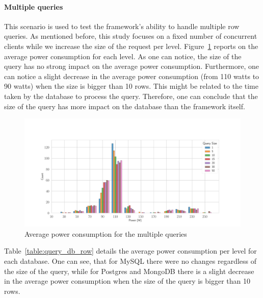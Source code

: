 \paragraph{Multiple queries}
This scenario is used to test the framework's ability to handle multiple row queries.
As mentioned before, this study focuses on a fixed number of concurrent clients while we increase the size of the request per level.
Figure~\ref{fig:av_power_query} reports on the average power consumption for each level.
As one can notice, the size of the query has no strong impact on the average power consumption.
Furthermore, one can notice a slight decrease in the average power consumption (from 110 watts to 90 watts) when the size is bigger than 10 rows.
This might be related to the time taken by the database to process the query.
Therefore, one can conclude that the size of the query has more impact on the database than the framework itself.

\begin{figure}[hbt]
    \centering
    \includegraphics[width=
        \columnwidth]{imgs/histogram_av_power_cpu_query}
    \caption{Average power consumption for the multiple queries}
    \label{fig:av_power_query}
\end{figure}

Table~\ref{table:query_db_row} details the average power consumption per level for each database.
One can see, that for MySQL there were no changes regardless of the size of the query, while for Postgres and MongoDB there is a slight decrease in the average power consumption when the size of the query is bigger than 10 rows.


